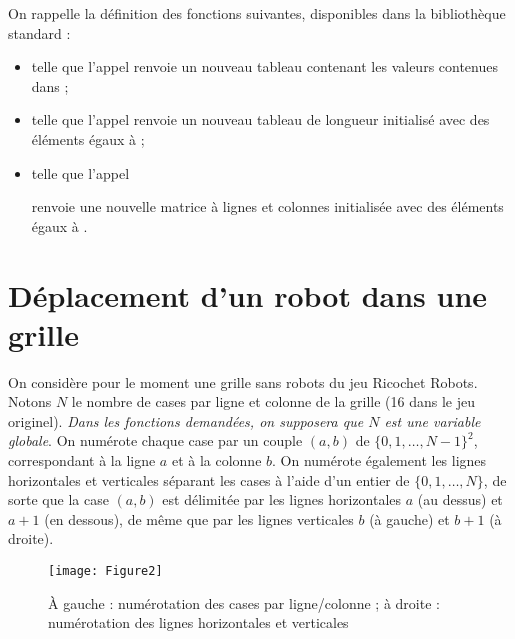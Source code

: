 On rappelle la définition des fonctions suivantes, disponibles dans la
bibliothèque standard  :
\begin{itemize}
\item {} telle que l'appel
 renvoie un nouveau tableau contenant les valeurs
contenues dans  ;

\item {} telle que l'appel
 renvoie un nouveau tableau de longueur 
initialisé avec des éléments égaux à  ;

\item {} telle que
l'appel 

 renvoie une nouvelle matrice à
 lignes et  colonnes initialisée avec des éléments
égaux à .
\end{itemize}
\section{Déplacement d’un robot dans une grille}
On considère pour le moment une grille sans robots du jeu Ricochet
Robots. Notons $N$ le nombre de cases par ligne et colonne de la grille
(16 dans le jeu originel). {\em Dans les fonctions demandées, on
supposera que $N$ est une variable globale}. On numérote chaque case par
un couple $(a,b)$ de $\{0, 1, \ldots, N-1\}^2$, correspondant à la ligne $a$ et à la
colonne $b$. On numérote également les lignes horizontales et verticales
séparant les cases à l’aide d’un entier de $\{0, 1, \ldots, N\}$, de sorte que la
case $(a,b)$ est délimitée par les lignes horizontales $a$ (au dessus)
et $a+1$ (en dessous), de même que par les lignes verticales $b$ (à
gauche) et $b+1$ (à droite).
\begin{figure}[ht]
\begin{center}
\texttt{[image: Figure2]}
\caption{À gauche : numérotation des cases par ligne/colonne ;
à droite : numérotation des lignes horizontales et verticales
}
\end{center}
\end{figure}


